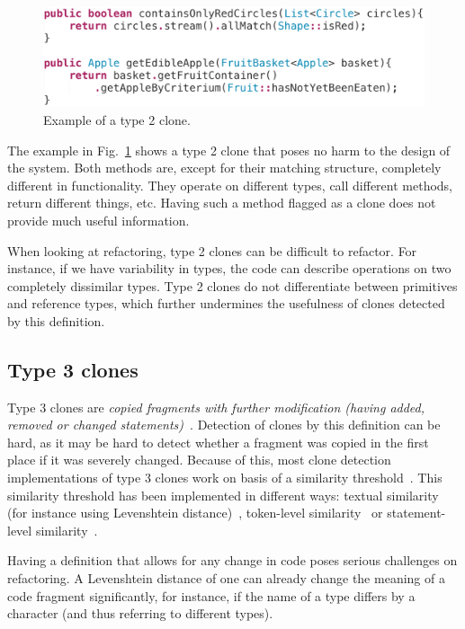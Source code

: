 \documentclass[a4paper]{article}
\begin{document}
\begin{figure}[H]
  \includegraphics[width=1\columnwidth]{img/type2}
  \caption{Example of a type 2 clone.}
  \label{fig:type2}
\end{figure}

The example in Fig.~\ref{fig:type2} shows a type 2 clone that poses no harm to the design of the system. Both methods are, except for their matching structure, completely different in functionality. They operate on different types, call different methods, return different things, etc. Having such a method flagged as a clone does not provide much useful information.

When looking at refactoring, type 2 clones can be difficult to refactor. For instance, if we have variability in types, the code can describe operations on two completely dissimilar types. Type 2 clones do not differentiate between primitives and reference types, which further undermines the usefulness of clones detected by this definition.

\subsection{Type 3 clones}\label{sec:type3}
Type 3 clones are \textit{copied fragments with further modification (having added, removed or changed statements)}~\cite{roy2007survey}. Detection of clones by this definition can be hard, as it may be hard to detect whether a fragment was copied in the first place if it was severely changed. Because of this, most clone detection implementations of type 3 clones work on basis of a similarity threshold~\cite{roy2008nicad,ragkhitwetsagul2019siamese,jiang2007deckard,semura2017ccfindersw}. This similarity threshold has been implemented in different ways: textual similarity (for instance using Levenshtein distance)~\cite{lavoie2011automated}, token-level similarity~\cite{sajnani2016sourcerercc} or statement-level similarity~\cite{kamalpriya2017enhancing}.

Having a definition that allows for any change in code poses serious challenges on refactoring. A Levenshtein distance of one can already change the meaning of a code fragment significantly, for instance, if the name of a type differs by a character (and thus referring to different types).
\end{document}
